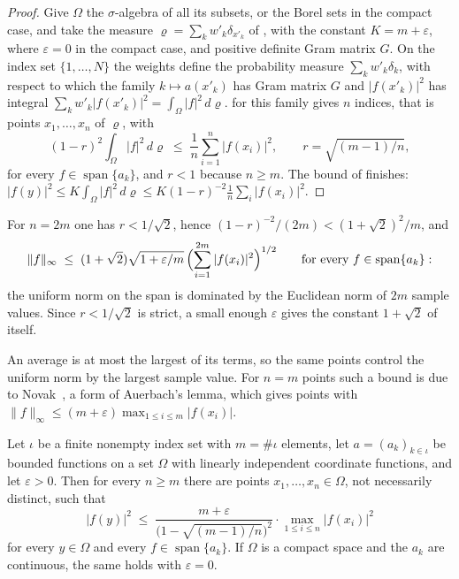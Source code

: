 \begin{proof}
\leanok
{}
Give $\Omega$ the $\sigma$-algebra of all its subsets, or the Borel sets in the compact
case, and take the measure $\varrho = \sum_k w'_k \delta_{x'_k}$ of
, with the constant $K = m + \varepsilon$, where
$\varepsilon = 0$ in the compact case, and positive definite Gram matrix $G$. On the index
set $\{1, \dots, N\}$ the weights define the probability measure $\sum_k w'_k \delta_k$,
with respect to which the family $k \mapsto a(x'_k)$ has Gram matrix $G$ and
$|f(x'_k)|^2$ has integral $\sum_k w'_k |f(x'_k)|^2 = \int_\Omega |f|^2 \, d\varrho$.
 for this family gives $n$ indices, that is points
$x_1, \dots, x_n$ of $\varrho$, with
\[
  (1 - r)^2 \int_\Omega |f|^2 \, d\varrho \; \leq \; \frac{1}{n} \sum_{i=1}^n |f(x_i)|^2,
  \qquad r = \sqrt{(m-1)/n},
\]
for every $f \in \operatorname{span}\{a_k\}$, and $r < 1$ because $n \geq m$. The bound of
 finishes:
$|f(y)|^2 \leq K \int_\Omega |f|^2 \, d\varrho \leq K (1 - r)^{-2} \frac{1}{n} \sum_i |f(x_i)|^2$.
\end{proof}

For $n = 2m$ one has $r < 1/\sqrt{2}$, hence $(1 - r)^{-2} / (2m) < (1 + \sqrt{2})^2 / m$,
and
\[
  \|f\|_\infty \; \leq \; (1 + \sqrt{2}) \sqrt{1 + \varepsilon/m} \,
    \Bigl( \sum_{i=1}^{2m} |f(x_i)|^2 \Bigr)^{1/2}
  \qquad \text{for every } f \in \operatorname{span}\{a_k\}:
\]
the uniform norm on the span is dominated by the Euclidean norm of $2m$ sample values. Since
$r < 1/\sqrt{2}$ is strict, a small enough $\varepsilon$ gives the constant $1 + \sqrt{2}$
of~\cite{CDKU} itself.

An average is at most the largest of its terms, so the same points control the uniform norm
by the largest sample value. For $n = m$ points such a bound is due to
Novak~\cite[Lemma~1.2.2]{N88}, a form of Auerbach's lemma, which gives points with
$\|f\|_\infty \leq (m + \varepsilon) \max_{1 \leq i \leq m} |f(x_i)|$.

\begin{corollary}
\label{cor:uniform-discretization-by-max}
\leanok
Let $\iota$ be a finite nonempty index set with $m = \#\iota$ elements, let
$a = (a_k)_{k \in \iota}$ be bounded functions on a set $\Omega$ with linearly independent
coordinate functions, and let $\varepsilon > 0$. Then for every $n \geq m$ there are points
$x_1, \dots, x_n \in \Omega$, not necessarily distinct, such that
\[
  |f(y)|^2 \; \leq \; \frac{m + \varepsilon}{\bigl( 1 - \sqrt{(m-1)/n} \bigr)^2}
    \cdot \max_{1 \leq i \leq n} |f(x_i)|^2
\]
for every $y \in \Omega$ and every $f \in \operatorname{span}\{a_k\}$. If $\Omega$ is a
compact space and the $a_k$ are continuous, the same holds with $\varepsilon = 0$.
\end{corollary}

